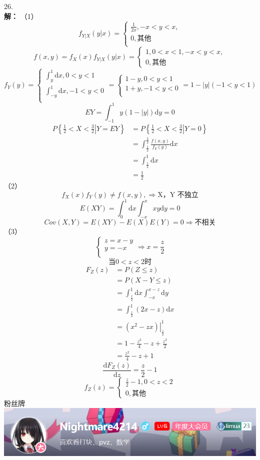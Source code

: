 \documentclass[a4paper]{article}
\begin{document}
26.\\
\textbf{解：}
（1）\\
$$f_{\left. Y\right| X}(\left. y\right| x)=\begin{cases}
    \frac{1}{2x},-x< y < x,\\
    0,\text{其他}\\
\end{cases}$$
$$f(x,y)=f_{X}(x) f_{\left. Y\right| X}(\left. y\right| x)=\begin{cases}
    1,0<x<1,-x< y < x,\\
    0,\text{其他}
\end{cases}$$
$$f_{Y}(y)=\begin{cases}
    \int_{y}^{1}\mathrm{d}x,0< y < 1\\
    \int_{-y}^{1}\mathrm{d}x, -1< y <0\\
\end{cases}=\begin{cases}
    1-y,0<y<1\\
    1+y,-1<y<0\\
\end{cases}=1-\left|y\right| (-1<y<1)$$
$$EY=\int_{-1}^{1}y(1-\left|y\right|)\mathrm{d}y=0$$
\begin{align*}
    P\left\{\left. \frac{1}{2}<X<\frac{3}{2} \right|Y=EY\right\}
    &=P\left\{\left. \frac{1}{2}<X<\frac{3}{2} \right|Y=0\right\}\\
    &=\int_{\frac{1}{2}}^{\frac{3}{2}}\frac{f(x,y)}{f_{Y}(y)}\mathrm{d}x\\
    &=\int_{\frac{1}{2}}^{1}\mathrm{d}x\\
    &=\frac{1}{2}
\end{align*}
（2）\\
$$f_{X}(x)f_{Y}(y)\neq f(x,y),\Rightarrow \text{X，Y 不独立}$$
$$E(XY)=\int_{0}^{1}\mathrm{d} x \int_{-x}^{x} xy\mathrm{d}{y} =0$$
$$Cov(X,Y)=E(XY)-E(X)E(Y)=0\Rightarrow \text{不相关}$$
（3）\\
$$\begin{cases}
    z=x-y\\
    y=-x\\
\end{cases} \Rightarrow x=\frac{z}{2}$$
$$\text{当}0<z<2\text{时}$$
\begin{align*}
    F_{Z}(z)&=P(Z\le z)\\
    &=P(X-Y\le z)\\
    &=\int_{\frac{z}{2}}^{1}\mathrm{d}x\int_{-x}^{x-z}\mathrm{d}y\\
    &=\int_{\frac{z}{2}}^{1} (2x-z)\mathrm{d}x\\
    &=\left. (x^2-zx)\right|_{\frac{z}{2}}^{1}\\
    &=1-\frac{z^2}{4}-z+\frac{z^2}{2}\\
    &=\frac{z^2}{4}-z+1
\end{align*}
$$\frac{\mathrm{d} F_{Z}(z)}{\mathrm{d}z}=\frac{z}{2}-1$$
$$f_Z(z)=\begin{cases}
    \frac{z}{2}-1,0<z<2\\
    0,\text{其他}
\end{cases}$$
\newpage
粉丝牌\\
\includegraphics{fan_club.PNG} 
\end{document}

